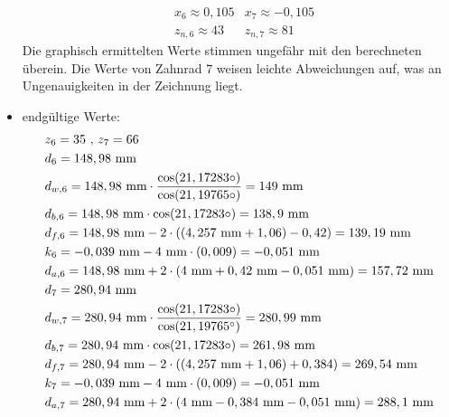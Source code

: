 \begin{itemize}
\begin{align*}
	&x_6 \approx 0,105 &x_7 \approx -0,105 \\
	&z_{n,6} \approx 43 & z_{n,7} \approx 81	
\end{align*}
Die graphisch ermittelten Werte stimmen ungefähr mit den berechneten überein. Die Werte von Zahnrad 7 weisen leichte Abweichungen auf, was an Ungenauigkeiten in der Zeichnung liegt. \\
\item endgültige Werte:
\begin{align*}
	&z_6 = 35 \text{ , } z_7 = 66 \\
	&d_6 = 148,98 \text{ mm} \\
	&d_{w,6} = 148,98  \text{ mm}\cdot \frac{\cos(21,17283\circ)}{\cos(21,19765\circ)} = 149 \text{ mm}\\
	&d_{b,6} = 148,98  \text{ mm} \cdot \cos(21,17283\circ) = 138,9  \text{ mm}\\
	&d_{f,6} = 148,98  \text{ mm} -2 \cdot ((4,257 \text{ mm}+1,06)-0,42) = 139,19 \text{ mm}\\
	&k_6 = -0,039 \text{ mm} -4 \text{ mm} \cdot (0,009) =- 0,051 \text{ mm}\\
	&d_{a,6} = 148,98  \text{ mm} +2 \cdot (4\text{ mm}+0,42 \text{ mm} -0,051 \text{ mm}) = 157,72\text{ mm}\\
	&d_7 =280,94 \text{ mm} \\
	&d_{w,7} =280,94  \text{ mm}\cdot \frac{\cos(21,17283\circ)}{\cos(21,19765^\circ)} = 280,99  \text{ mm}\\
	&d_{b,7} = 280,94  \text{ mm} \cdot \cos(21,17283\circ) = 261,98 \text{ mm}\\
	&d_{f,7} = 280,94  \text{ mm} -2 \cdot ((4,257 \text{ mm}+1,06)+0,384) = 269,54 \text{ mm}\\
	&k_7 = -0,039 \text{ mm} -4 \text{ mm} \cdot (0,009) =- 0,051 \text{ mm}\\
	&d_{a,7} = 280,94  \text{ mm} +2 \cdot (4\text{ mm}-0,384 \text{ mm} -0,051 \text{ mm}) = 288,1\text{ mm}
\end{align*}	
\end{itemize}
\newpage
